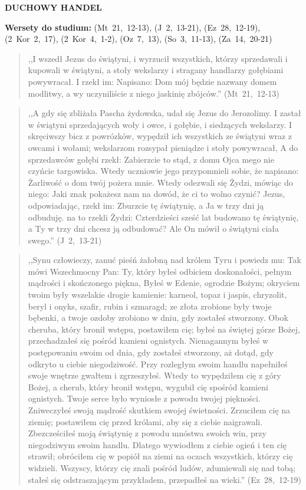 \documentclass[10pt,a4paper,oneside]{article}
\begin{document}
\centerline{\textbf{\MakeUppercase{Duchowy handel}}}
\begin{center}
\textbf{Wersety do studium:} \mbox{(Mt 21, 12-13)}, \mbox{(J 2, 13-21)}, \mbox{(Ez 28, 12-19)}, \mbox{(2 Kor 2, 17)}, \mbox{(2 Kor 4, 1-2)}, \mbox{(Oz 7, 13)}, \mbox{(So 3, 11-13)}, \mbox{(Za 14, 20-21)}
\end{center}
\begin{quote}
,,I wszedł Jezus do świątyni, i wyrzucił wszystkich, którzy sprzedawali i kupowali w świątyni, a stoły wekslarzy i stragany handlarzy gołębiami powywracał. I rzekł im: Napisano: Dom mój będzie nazwany domem modlitwy, a wy uczyniliście z niego jaskinię zbójców.'' \mbox{(Mt 21, 12-13)}
\end{quote}
\begin{quote}
,,A gdy się zbliżała Pascha żydowska, udał się Jezus do Jerozolimy. I zastał w świątyni sprzedających woły i owce, i gołębie, i siedzących wekslarzy. I skręciwszy bicz z powrózków, wypędził ich wszystkich ze świątyni wraz z owcami i wołami; wekslarzom rozsypał pieniądze i stoły powywracał, A do sprzedawców gołębi rzekł: Zabierzcie to stąd, z domu Ojca mego nie czyńcie targowiska. Wtedy uczniowie jego przypomnieli sobie, że napisano: Żarliwość o dom twój pożera mnie. Wtedy odezwali się Żydzi, mówiąc do niego: Jaki znak pokażesz nam na dowód, że ci to wolno czynić? Jezus, odpowiadając, rzekł im: Zburzcie tę świątynię, a Ja w trzy dni ją odbuduję. na to rzekli Żydzi: Czterdzieści sześć lat budowano tę świątynię, a Ty w trzy dni chcesz ją odbudować? Ale On mówił o świątyni ciała swego.'' \mbox{(J 2, 13-21)}
\end{quote}
\begin{quote}
,,Synu człowieczy, zanuć pieśń żałobną nad królem Tyru i powiedz mu: Tak mówi Wszechmocny Pan: Ty, który byłeś odbiciem doskonałości, pełnym mądrości i skończonego piękna, Byłeś w Edenie, ogrodzie Bożym; okryciem twoim były wszelakie drogie kamienie: karneol, topaz i jaspis, chryzolit, beryl i onyks, szafir, rubin i szmaragd; ze złota zrobione były twoje bębenki, a twoje ozdoby zrobiono w dniu, gdy zostałeś stworzony. Obok cheruba, który bronił wstępu, postawiłem cię; byłeś na świętej górze Bożej, przechadzałeś się pośród kamieni ognistych. Nienagannym byłeś w postępowaniu swoim od dnia, gdy zostałeś stworzony, aż dotąd, gdy odkryto u ciebie niegodziwość. Przy rozległym swoim handlu napełniłeś swoje wnętrze gwałtem i zgrzeszyłeś. Wtedy to wypędziłem cię z góry Bożej, a cherub, który bronił wstępu, wygubił cię spośród kamieni ognistych. Twoje serce było wyniosłe z powodu twojej piękności. Zniweczyłeś swoją mądrość skutkiem swojej świetności. Zrzuciłem cię na ziemię; postawiłem cię przed królami, aby się z ciebie naigrawali. Zbezcześciłeś moją świątynię z powodu mnóstwa swoich win, przy niegodziwym swoim handlu. Dlatego wywiodłem z ciebie ogień i ten cię strawił; obróciłem cię w popiół na ziemi na oczach wszystkich, którzy cię widzieli. Wszyscy, którzy cię znali pośród ludów, zdumiewali się nad tobą; stałeś się odstraszającym przykładem, przepadłeś na wieki.'' \mbox{(Ez 28, 12-19)}
\end{quote}
\end{document}
